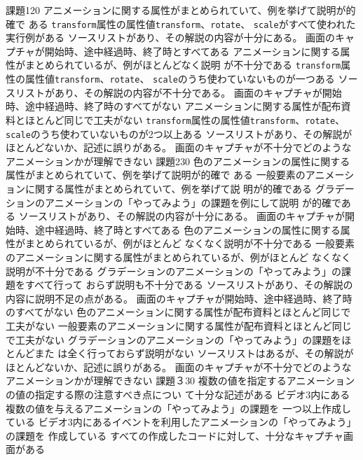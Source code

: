 \documentclass[a4j]{jreport}
\begin{document}
{{課題1}{20}
  {
  {アニメーションに関する属性がまとめられていて、例を挙げて説明が的確で
  ある}
  {\texttt{transform}属性の属性値\texttt{transform}、\texttt{rotate}、
  \texttt{scale}がすべて使われた実行例がある}
  {ソースリストがあり、その解説の内容が十分にある。}
  {画面のキャプチャが開始時、途中経過時、終了時とすべてある}
  }
  {
  {アニメーションに関する属性がまとめられているが、例がほとんどなく説明
  が不十分である}
  {\texttt{transform}属性の属性値\texttt{transform}、\texttt{rotate}、
  \texttt{scale}のうち使わていないものが一つある}
  {ソースリストがあり、その解説の内容が不十分である。}
  {画面のキャプチャが開始時、途中経過時、終了時のすべてがない}
  }
  {
  {アニメーションに関する属性が配布資料とほとんど同じで工夫がない}
  {\texttt{transform}属性の属性値\texttt{transform}、\texttt{rotate}、
  \texttt{scale}のうち使わていないものが2つ以上ある}
  {ソースリストがあり、その解説がほとんどないか、記述に誤りがある。}
  {画面のキャプチャが不十分でどのようなアニメーションかが理解できない}
  }
  {課題2}{30}
  {
  {色のアニメーションの属性に関する属性がまとめられていて、例を挙げて説明が的確で
  ある}
  {一般要素のアニメーションに関する属性がまとめられていて、例を挙げて説
  明が的確である}
  {グラデーションのアニメーションの「やってみよう」の課題を例にして説明
  が的確である}
  {ソースリストがあり、その解説の内容が十分にある。}
  {画面のキャプチャが開始時、途中経過時、終了時とすべてある}
  }
  {
  {色のアニメーションの属性に関する属性がまとめられているが、例がほとんど
  なくなく説明が不十分である}
  {一般要素のアニメーションに関する属性がまとめられているが、例がほとんど
  なくなく説明が不十分である}
  {グラデーションのアニメーションの「やってみよう」の課題をすべて行って
  おらず説明も不十分である}
  {ソースリストがあり、その解説の内容に説明不足の点がある。}
  {画面のキャプチャが開始時、途中経過時、終了時のすべてがない}
  }
  {
  {色のアニメーションに関する属性が配布資料とほとんど同じで工夫がない}
  {一般要素のアニメーションに関する属性が配布資料とほとんど同じで工夫がない}
  {グラデーションのアニメーションの「やってみよう」の課題をほとんどまた
  は全く行っておらず説明がない}
  {ソースリストはあるが、その解説がほとんどないか、記述に誤りがある。}
  {画面のキャプチャが不十分でどのようなアニメーションかが理解できない}
  }
	{課題３}{30}{
	{複数の値を指定するアニメーションの値の指定する際の注意すべき点につい
	て十分な記述がある}
	{ビデオ3内にある複数の値を与えるアニメーションの「やってみよう」の課題を
一つ以上作成している}
	{ビデオ3内にあるイベントを利用したアニメーションの「やってみよう」の課題を
作成している}
	{すべての作成したコードに対して、十分なキャプチャ画面がある}
}}
\end{document}
